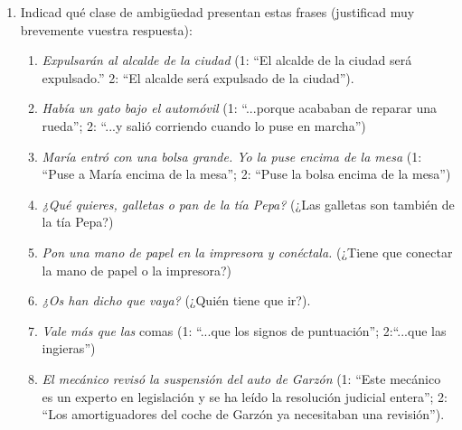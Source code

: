 \begin{enumerate} \item Indicad qué clase de ambigüedad presentan estas frases (justificad muy brevemente vuestra respuesta): \begin{enumerate} \item \emph{Expulsarán al alcalde de la ciudad} (1: ``El alcalde de la ciudad será expulsado.'' 2: ``El alcalde será expulsado de la ciudad''). \item \emph{ Había un gato bajo el automóvil} (1: ``...porque acababan de reparar una rueda''; 2: ``...y salió corriendo cuando lo puse en marcha'') \item \emph{María entró con una bolsa grande. Yo la puse encima de la mesa} (1: ``Puse a María encima de la mesa''; 2: ``Puse la bolsa encima de la mesa'') \item \emph{¿Qué quieres, galletas o pan de la tía Pepa?} (¿Las galletas son también de la tía Pepa?) \item \emph{Pon una mano de papel en la impresora y conéctala.} (¿Tiene que conectar la mano de papel o la impresora?) \item \emph{¿Os han dicho que vaya?} (¿Quién tiene que ir?). \item \emph{Vale más que las} comas (1: ``...que los signos de puntuación''; 2:``...que las ingieras'') \item \emph{El mecánico revisó la suspensión del auto de Garzón} (1: ``Este mecánico es un experto en legislación y se ha leído la resolución judicial entera''; 2: ``Los amortiguadores del coche de Garzón ya necesitaban una revisión''). 


\end{enumerate}
\end{enumerate}
